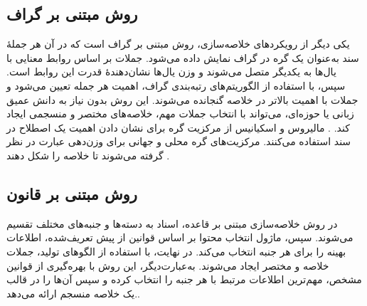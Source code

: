 \subsection{روش مبتنی بر گراف}
یکی دیگر از رویکردهای خلاصه‌سازی، روش مبتنی بر گراف است که در آن هر جملهٔ سند به‌عنوان یک گره در گراف نمایش داده می‌شود. جملات بر اساس روابط معنایی با یال‌ها به یکدیگر متصل می‌شوند و وزن یال‌ها نشان‌دهندهٔ قدرت این روابط است. سپس، با استفاده از الگوریتم‌های رتبه‌بندی گراف، اهمیت هر جمله تعیین می‌شود و جملات با اهمیت بالاتر در خلاصه گنجانده می‌شوند. این روش بدون نیاز به دانش عمیق زبانی یا حوزه‌ای، می‌تواند با انتخاب جملات مهم، خلاصه‌های مختصر و منسجمی ایجاد کند.
\cite{andhale2016overview}.
مالیروس و اسکیانیس  از مرکزیت گره برای نشان دادن اهمیت یک اصطلاح در سند استفاده می‌کنند. مرکزیت‌های گره محلی و جهانی برای وزن‌دهی عبارت در نظر گرفته می‌شوند تا خلاصه را شکل دهند
\cite{GraphBased}.
\subsection{روش مبتنی بر قانون }


در روش خلاصه‌سازی مبتنی بر قاعده، اسناد به دسته‌ها و جنبه‌های مختلف تقسیم می‌شوند. سپس، ماژول انتخاب محتوا بر اساس قوانین از پیش تعریف‌شده، اطلاعات بهینه را برای هر جنبه انتخاب می‌کند. در نهایت، با استفاده از الگوهای تولید، جملات خلاصه و مختصر ایجاد می‌شوند. به‌عبارت‌دیگر، این روش با بهره‌گیری از قوانین مشخص، مهم‌ترین اطلاعات مرتبط با هر جنبه را انتخاب کرده و سپس آن‌ها را در قالب یک خلاصه منسجم ارائه می‌دهد.\cite{Moratanchsurvey}.




